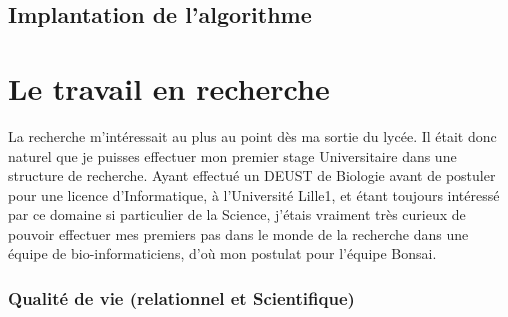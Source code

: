 \documentclass{report}
\begin{document}
\section{Implantation de l'algorithme}

\chapter{Le travail en recherche}

La recherche m'intéressait au plus au point dès ma sortie du lycée.
\newline
Il était donc naturel que je puisses effectuer mon premier stage Universitaire dans une structure de recherche. Ayant effectué un DEUST de Biologie avant de postuler pour une licence d'Informatique, à l'Université Lille1, et étant toujours intéressé par ce domaine si particulier de la Science, j'étais vraiment très curieux de pouvoir effectuer mes premiers pas dans le monde de la recherche dans une équipe de bio-informaticiens, d'où mon postulat pour l'équipe Bonsai.

\subsection{Qualité de vie (relationnel et Scientifique)}
\end{document}
